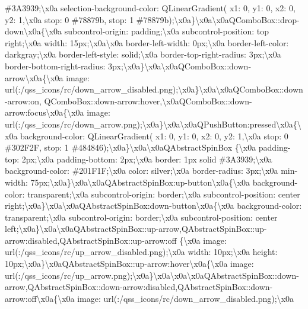 \#3\+A3939;\textbackslash{}x0a selection-\/background-\/color\+: Q\+Linear\+Gradient( x1\+: 0, y1\+: 0, x2\+: 0, y2\+: 1,\textbackslash{}x0a stop\+: 0 \#78879b, stop\+: 1 \#78879b);\textbackslash{}x0a\}\textbackslash{}x0a\textbackslash{}x0a\+Q\+Combo\+Box\+::drop-\/down\textbackslash{}x0a\{\textbackslash{}x0a subcontrol-\/origin\+: padding;\textbackslash{}x0a subcontrol-\/position\+: top right;\textbackslash{}x0a width\+: 15px;\textbackslash{}x0a\textbackslash{}x0a border-\/left-\/width\+: 0px;\textbackslash{}x0a border-\/left-\/color\+: darkgray;\textbackslash{}x0a border-\/left-\/style\+: solid;\textbackslash{}x0a border-\/top-\/right-\/radius\+: 3px;\textbackslash{}x0a border-\/bottom-\/right-\/radius\+: 3px;\textbackslash{}x0a\}\textbackslash{}x0a\textbackslash{}x0a\+Q\+Combo\+Box\+::down-\/arrow\textbackslash{}x0a\{\textbackslash{}x0a image\+: url(\+:/qss\+\_\+icons/rc/down\+\_\+arrow\+\_\+disabled.\+png);\textbackslash{}x0a\}\textbackslash{}x0a\textbackslash{}x0a\+Q\+Combo\+Box\+::down-\/arrow\+:on, Q\+Combo\+Box\+::down-\/arrow\+:hover,\textbackslash{}x0a\+Q\+Combo\+Box\+::down-\/arrow\+:focus\textbackslash{}x0a\{\textbackslash{}x0a image\+: url(\+:/qss\+\_\+icons/rc/down\+\_\+arrow.\+png);\textbackslash{}x0a\}\textbackslash{}x0a\textbackslash{}x0a\+Q\+Push\+Button\+:pressed\textbackslash{}x0a\{\textbackslash{}x0a background-\/color\+: Q\+Linear\+Gradient( x1\+: 0, y1\+: 0, x2\+: 0, y2\+: 1,\textbackslash{}x0a stop\+: 0 \#302\+F2\+F, stop\+: 1 \#484846);\textbackslash{}x0a\}\textbackslash{}x0a\textbackslash{}x0a\+Q\+Abstract\+Spin\+Box \{\textbackslash{}x0a padding-\/top\+: 2px;\textbackslash{}x0a padding-\/bottom\+: 2px;\textbackslash{}x0a border\+: 1px solid \#3\+A3939;\textbackslash{}x0a background-\/color\+: \#201\+F1\+F;\textbackslash{}x0a color\+: silver;\textbackslash{}x0a border-\/radius\+: 3px;\textbackslash{}x0a min-\/width\+: 75px;\textbackslash{}x0a\}\textbackslash{}x0a\textbackslash{}x0a\+Q\+Abstract\+Spin\+Box\+:up-\/button\textbackslash{}x0a\{\textbackslash{}x0a background-\/color\+: transparent;\textbackslash{}x0a subcontrol-\/origin\+: border;\textbackslash{}x0a subcontrol-\/position\+: center right;\textbackslash{}x0a\}\textbackslash{}x0a\textbackslash{}x0a\+Q\+Abstract\+Spin\+Box\+:down-\/button\textbackslash{}x0a\{\textbackslash{}x0a background-\/color\+: transparent;\textbackslash{}x0a subcontrol-\/origin\+: border;\textbackslash{}x0a subcontrol-\/position\+: center left;\textbackslash{}x0a\}\textbackslash{}x0a\textbackslash{}x0a\+Q\+Abstract\+Spin\+Box\+::up-\/arrow,\+Q\+Abstract\+Spin\+Box\+::up-\/arrow\+:disabled,\+Q\+Abstract\+Spin\+Box\+::up-\/arrow\+:off \{\textbackslash{}x0a image\+: url(\+:/qss\+\_\+icons/rc/up\+\_\+arrow\+\_\+disabled.\+png);\textbackslash{}x0a width\+: 10px;\textbackslash{}x0a height\+: 10px;\textbackslash{}x0a\}\textbackslash{}x0a\+Q\+Abstract\+Spin\+Box\+::up-\/arrow\+:hover\textbackslash{}x0a\{\textbackslash{}x0a image\+: url(\+:/qss\+\_\+icons/rc/up\+\_\+arrow.\+png);\textbackslash{}x0a\}\textbackslash{}x0a\textbackslash{}x0a\textbackslash{}x0a\+Q\+Abstract\+Spin\+Box\+::down-\/arrow,\+Q\+Abstract\+Spin\+Box\+::down-\/arrow\+:disabled,\+Q\+Abstract\+Spin\+Box\+::down-\/arrow\+:off\textbackslash{}x0a\{\textbackslash{}x0a image\+: url(\+:/qss\+\_\+icons/rc/down\+\_\+arrow\+\_\+disabled.\+png);\textbackslash{}x0a 